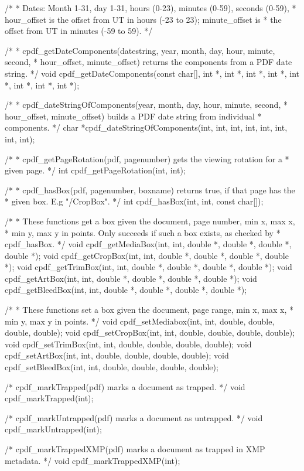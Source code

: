 /*
 * Dates: Month 1-31, day 1-31, hours (0-23), minutes (0-59), seconds (0-59),
 * hour_offset is the offset from UT in hours (-23 to 23); minute_offset is
 * the offset from UT in minutes (-59 to 59).
 */

/*
 * cpdf_getDateComponents(datestring, year, month, day, hour, minute, second,
 * hour_offset, minute_offset) returns the components from a PDF date string.
 */
void cpdf_getDateComponents(const char[], int *, int *, int *, int *, int *,
                            int *, int *, int *);

/*
 * cpdf_dateStringOfComponents(year, month, day, hour, minute, second,
 * hour_offset, minute_offset) builds a PDF date string from individual
 * components.
 */
char *cpdf_dateStringOfComponents(int, int, int, int, int, int, int, int);

/*
 * cpdf_getPageRotation(pdf, pagenumber) gets the viewing rotation for a
 * given page.
 */
int cpdf_getPageRotation(int, int);

/*
 * cpdf_hasBox(pdf, pagenumber, boxname) returns true, if that page has the
 * given box. E.g "/CropBox".
 */
int cpdf_hasBox(int, int, const char[]);

/*
 * These functions get a box given the document, page number, min x, max x,
 * min y, max y in points. Only succeeds if such a box exists, as checked by
 * cpdf_hasBox.
 */
void cpdf_getMediaBox(int, int, double *, double *, double *, double *);
void cpdf_getCropBox(int, int, double *, double *, double *, double *);
void cpdf_getTrimBox(int, int, double *, double *, double *, double *);
void cpdf_getArtBox(int, int, double *, double *, double *, double *);
void cpdf_getBleedBox(int, int, double *, double *, double *, double *);

/*
 * These functions set a box given the document, page range, min x, max x,
 * min y, max y in points.
 */
void cpdf_setMediabox(int, int, double, double, double, double);
void cpdf_setCropBox(int, int, double, double, double, double);
void cpdf_setTrimBox(int, int, double, double, double, double);
void cpdf_setArtBox(int, int, double, double, double, double);
void cpdf_setBleedBox(int, int, double, double, double, double);

/* cpdf_markTrapped(pdf) marks a document as trapped. */
void cpdf_markTrapped(int);

/* cpdf_markUntrapped(pdf) marks a document as untrapped. */
void cpdf_markUntrapped(int);

/* cpdf_markTrappedXMP(pdf) marks a document as trapped in XMP metadata. */
void cpdf_markTrappedXMP(int);

